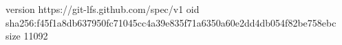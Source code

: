 version https://git-lfs.github.com/spec/v1
oid sha256:f45f1a8db637950fc71045cc4a39e835f71a6350a60e2dd4db054f82be758ebc
size 11092
